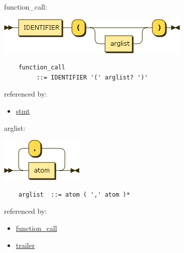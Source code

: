 \begin{minipage}{\textwidth}
    \protect\hypertarget{function_call}{}{function\_call:}

    \includegraphics[width=3.64583in,height=0.70833in]{diagram/function_call.png}

    \begin{verbatim}
    function_call
         ::= IDENTIFIER '(' arglist? ')'
    \end{verbatim}

    referenced by:

    \begin{itemize}
            \tightlist
        \item
            \protect\hyperlink{stmt}{stmt}
    \end{itemize}

\end{minipage}

\begin{minipage}{\textwidth}
    \protect\hypertarget{arglist}{}{arglist:}

    \includegraphics[width=1.56250in,height=0.83333in]{diagram/arglist.png}

    \begin{verbatim}
    arglist  ::= atom ( ',' atom )*
    \end{verbatim}

    referenced by:

    \begin{itemize}
            \tightlist
        \item
            \protect\hyperlink{function_call}{function\_call}
        \item
            \protect\hyperlink{trailer}{trailer}
    \end{itemize}

\end{minipage}

